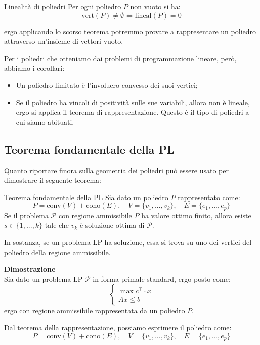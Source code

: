 \documentclass[a4paper,11pt]{article}
\begin{document}
\begin{theorem}{Linealità di poliedri}
	Per ogni poliedro $P$ non vuoto si ha:
	$$
		\mathrm{vert}(P) \neq \emptyset \Leftrightarrow \mathrm{lineal}(P) = {0}
	$$
\end{theorem}
ergo applicando lo scorso teorema potremmo provare a rappresentare un poliedro attraverso un'insieme di vettori vuoto.

Per i poliedri che otteniamo dai problemi di programmazione lineare, però, abbiamo i corollari:
\begin{itemize}
	\item Un poliedro limitato è l'involucro convesso dei suoi vertici;
	\item Se il poliedro ha vincoli di positività sulle sue variabili, allora non è lineale, ergo si applica il teorema di rappresentazione.
		Questo è il tipo di poliedri a cui siamo abituati.
\end{itemize}

\subsection{Teorema fondamentale della PL}
Quanto riportare finora sulla geometria dei poliedri può essere usato per dimostrare il seguente teorema:
\begin{theorem}{Teorema fondamentale della PL}
	Sia dato un poliedro $P$ rappresentato come:
	$$ 
	P = \mathrm{conv}(V) + \mathrm{cono}(E), \quad V = \{ v_1, ..., v_k \}, \quad E = \{ e_1, ..., e_p \}
	$$
	Se il problema $\mathcal{P}$ con regione ammissibile $P$ ha valore ottimo finito, allora esiste $s \in \{ 1, ..., k \}$ tale che $v_k$ è soluzione ottima di $\mathcal{P}$.
\end{theorem}

In sostanza, se un problema LP ha soluzione, essa si trova su uno dei vertici del poliedro della regione ammissibile.

\par\medskip
\noindent
\textbf{\textsf{Dimostrazione}} \\
Sia dato un problema LP $\mathcal{P}$ in forma primale standard, ergo posto come:
\[
	\begin{cases}
		\max{c^\intercal \cdot x} \\ 
		Ax \leq b	
	\end{cases}
\]
ergo con regione ammissibile rappresentata da un poliedro $P$.

Dal teorema della rappresentazione, possiamo esprimere il poliedro come:
$$
	P = \mathrm{conv}(V) + \mathrm{cono}(E), \quad V = \{ v_1, ..., v_k \}, \quad E = \{ e_1, ..., e_p \}
$$
\end{document}

